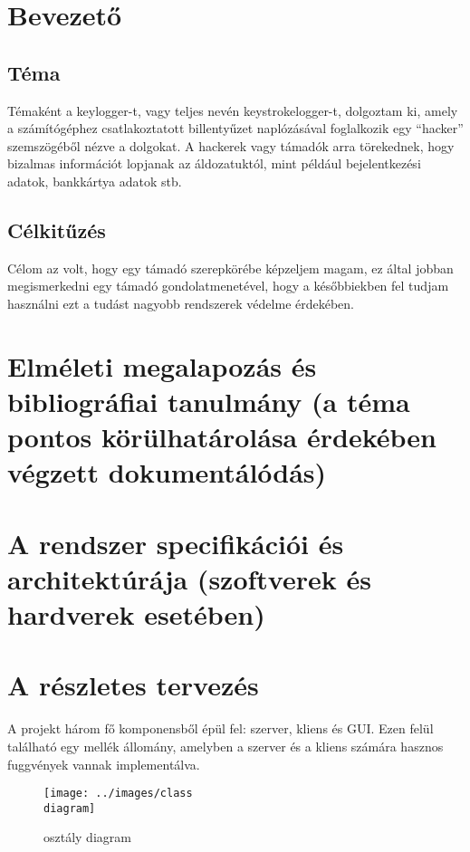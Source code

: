\documentclass[a4paper, 11pt]{article}
\begin{document}
\renewcommand{\listfigurename}{Ábrák jegyzéke}
\listoffigures
\thispagestyle{empty}
\cleardoublepage

\renewcommand{\listtablename}{Táblázatok jegyzéke}
\listoftables
\thispagestyle{empty}
\cleardoublepage

\setcounter{page}{1}
\setlength{\parindent}{0.5cm}
\section{Bevezető}\label{sec:intro}
\subsection{Téma}
Témaként a keylogger-t, vagy teljes nevén keystrokelogger-t, dolgoztam ki, amely a számítógéphez csatlakoztatott billentyűzet naplózásával foglalkozik egy ``hacker'' szemszögéből nézve a dolgokat. A hackerek vagy támadók arra törekednek, hogy bizalmas információt lopjanak az áldozatuktól, mint például bejelentkezési adatok, bankkártya adatok stb.

\subsection{Célkitűzés}
Célom az volt, hogy egy támadó szerepkörébe képzeljem magam, ez által jobban megismerkedni egy támadó gondolatmenetével, hogy a későbbiekben fel tudjam használni ezt a tudást nagyobb rendszerek védelme érdekében.

\section{Elméleti megalapozás és bibliográfiai tanulmány (a téma pontos körülhatárolása érdekében végzett dokumentálódás)}\label{sec:bibl}

\section{A rendszer specifikációi és architektúrája (szoftverek és hardverek esetében)}\label{sec:specs_and_arch}

\section{A részletes tervezés}\label{sec:plan}
A projekt három fő komponensből épül fel: szerver, kliens és GUI. Ezen felül található egy mellék állomány, amelyben a szerver és a kliens számára hasznos fuggvények vannak implementálva.
\begin{figure}[H]
\centering
\texttt{[image: ../images/class\\ diagram]}
\caption{osztály diagram}
\label{fig:classdia}
\end{figure}
\end{document}
